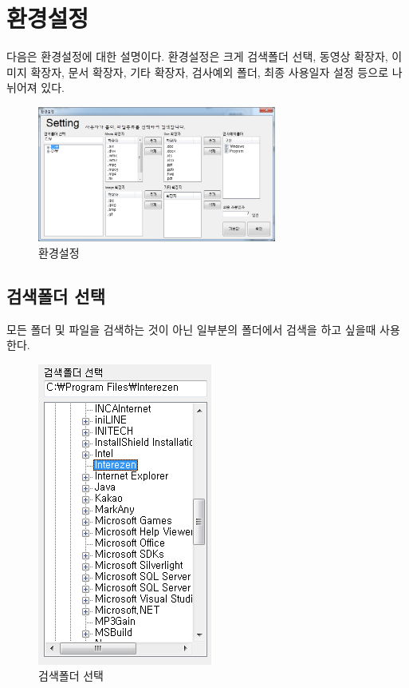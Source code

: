 \documentclass[letterpaper, 11pt]{article} %
\begin{document}
	\section{환경설정}
	다음은 환경설정에 대한 설명이다.	환경설정은 크게 검색폴더 선택, 동영상 확장자, 이미지 확장자, 문서 확장자, 기타 확장자, 검사예외 폴더, 최종 사용일자 설정 등으로 나뉘어져 있다.
	\begin{figure}[h]
		\centering
		\includegraphics[width=0.7\textwidth]{Figures/Setting}
		\caption{환경설정}
		\label{fig:setting}
	\end{figure}
	\subsection{검색폴더 선택}
	모든 폴더 및 파일을 검색하는 것이 아닌 일부분의 폴더에서 검색을 하고 싶을때 사용한다.
	\begin{figure}[h]
		\centering
		\includegraphics[height=0.35\textheight]{Figures/searchfolder}
		\caption{검색폴더 선택}
		\label{fig:searchfolder}
	\end{figure}
\end{document}
